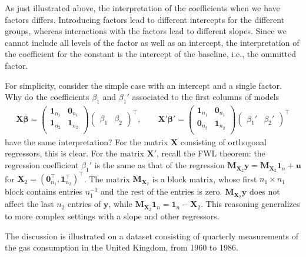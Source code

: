 \documentclass[]{book}
\theoremstyle{definition}
\theoremstyle{definition}
\theoremstyle{definition}
\theoremstyle{remark}
\begin{document}
As just illustrated above, the interpretation of the coefficients when we have factors differs. Introducing factors lead to different intercepts for the different groups, whereas interactions with the factors lead to different slopes. Since we cannot include all levels of the factor as well as an intercept, the interpretation of the coefficient for the constant is the intercept of the baseline, i.e., the ommitted factor.

For simplicity, consider the simple case with an intercept and a single factor. Why do the coefficients \(\beta_1\) and \(\beta_1'\) associated to the first columns of models
\begin{align*}
 \mathbf{X}\boldsymbol{\beta} = \begin{pmatrix}
       \mathbf{1}_{n_1} & \mathbf{0}_{n_1} \\
       \mathbf{1}_{n_2} & \mathbf{1}_{n_2}  \\
      \end{pmatrix}\begin{pmatrix} \beta_1 & \beta_2\end{pmatrix}^\top, \qquad 
      \mathbf{X}'\boldsymbol{\beta}' =  \begin{pmatrix}
       \mathbf{1}_{n_1} & \mathbf{0}_{n_1} \\
       \mathbf{0}_{n_2} & \mathbf{1}_{n_2}  \\
      \end{pmatrix}\begin{pmatrix} \beta_1' & \beta_2'\end{pmatrix}^\top
\end{align*}
have the same interpretation? For the matrix \(\mathbf{X}\) consisting of orthogonal regressors, this is
clear. For the matrix \(\mathbf{X}'\), recall the FWL theorem: the regression coefficient \(\beta_1'\) is the same as that of the regression
\(\mathbf{M}_{\mathbf{X}_2}\boldsymbol{y} = \mathbf{M}_{\mathbf{X}_2}\mathbf{1}_n + \boldsymbol{u}\) for \(\mathbf{X}_2 = (\mathbf{0}_{n_1}^\top, \mathbf{1}_{n_2}^\top)^\top\). The matrix
\(\mathbf{M}_{\mathbf{X}_2}\) is a block matrix, whose first \(n_1 \times n_1\) block contains entries \(n_1^{-1}\) and the rest of the entries is zero.
\(\mathbf{M}_{\mathbf{X}_2}\boldsymbol{y}\) does not affect the last \(n_2\) entries of \(\boldsymbol{y}\), while \(\mathbf{M}_{\mathbf{X}_2}\mathbf{1}_n = \mathbf{1}_n - \mathbf{X}_2\). This
reasoning generalizes to more complex settings with a slope and other regressors.

The discussion is illustrated on a dataset consisting of quarterly measurements of the gas consumption in the United Kingdom, from 1960 to 1986.
\end{document}
